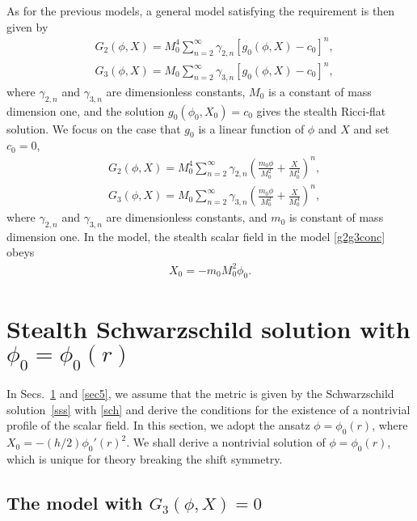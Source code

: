 \documentclass[prd,amsmath,amssymb,floatfix,superscriptaddress,notitlepage,nofootinbib,preprintnumbers]{revtex4-1}
\begin{document}
As for the previous models,
a general model satisfying the requirement is then given by 
\begin{align}
\label{g2g3gen}
&G_2(\phi,X)
=
M_0^4
\sum_{n=2}^\infty
\gamma_{2,n}
\left[
g_0(\phi,X)-c_0
\right]^n,
\nonumber
\\
&
G_3(\phi,X)
=
M_0
\sum_{n=2}^\infty
\gamma_{3,n}
\left[
g_0(\phi,X)-c_0
\right]^n,
\end{align}
where 
$\gamma_{2,n}$ and $\gamma_{3,n}$ are dimensionless constants,
$M_0$ is a constant of mass dimension one,
and the solution $g_0(\phi_0,X_0)=c_0$ gives the stealth Ricci-flat solution.
We focus on the case that $g_0$ is a linear function of $\phi$ and $X$ and set $c_0=0$,
\begin{align}
\label{g2g3conc}
&G_2(\phi,X)
=
M_0^4
\sum_{n=2}^\infty
\gamma_{2,n}
\left(
\frac{m_0\phi}{M_0^2}
+
\frac{X}{M_0^4}
\right)^n,
\nonumber
\\
&
G_3(\phi,X)
=
M_0
\sum_{n=2}^\infty
\gamma_{3,n}
\left(
\frac{m_0\phi}{M_0^2}
+
\frac{X}{M_0^4}
\right)^n,
\end{align}
where 
$\gamma_{2,n}$ and $\gamma_{3,n}$ are dimensionless constants,
and $m_0$ is constant of mass dimension one.
In the model,
the stealth scalar field in the model \eqref{g2g3conc} obeys
\begin{align}
\label{g2g3traj}
X_0=-m_0 M_0^2\phi_0.
\end{align}



\section{Stealth Schwarzschild solution with $\phi_0=\phi_0(r)$}
\label{sec4}


In Secs.~\ref{sec4} and \ref{sec5}, 
we assume that the metric is given by the Schwarzschild solution~\eqref{sss} with \eqref{sch}
and derive the conditions for the existence of
a nontrivial profile of the scalar field. 
In this section,
we adopt the ansatz $\phi=\phi_0(r)$, where $X_0=-(h/2)\phi_0'(r)^2$.
We shall derive a nontrivial solution of $\phi=\phi_0(r)$, which is unique for theory breaking the shift symmetry.


\subsection{The model with $G_3(\phi,X)=0$}
\label{sec41}
\end{document}

